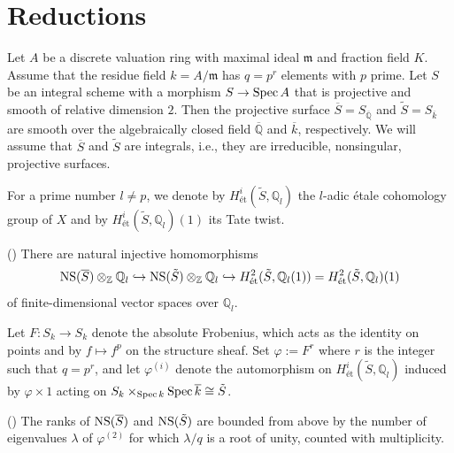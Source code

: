 \documentclass[main]{subfiles}
\begin{document}
\section{Reductions}
\label{sec:reduction}

Let $A$ be a discrete valuation ring with maximal ideal $\mathfrak{m}$ and fraction field $K$.
Assume that the residue field $k=A/\mathfrak{m}$ has $q=p^r$ elements with $p$ prime.
Let $S$ be an integral scheme with a morphism $S \to \operatorname{Spec} A$ that is projective and smooth of relative dimension $2$.
Then the projective surface $\overline{S}=S_{\overline{\mathbb{Q}}}$ and $\tilde{S}=S_{\overline{k}}$ are smooth over the algebraically closed field $\overline{\mathbb{Q}}$ and $\overline{k}$, respectively.
We will assume that $\overline{S}$ and $\tilde{S}$ are integrals, i.e., they are irreducible, nonsingular, projective surfaces.

For a prime number $l \neq p$, we denote by $H_{\text{\'et}}^{i}(\tilde{S}, \mathbb{Q}_l)$ the $l$-adic \'etale cohomology group of $X$ and by $H_{\text{\'et}}^{i}(\tilde{S}, \mathbb{Q}_l)(1)$ its Tate twist.

\begin{thm}{(\cite[Proposition 6.2.]{ref:vanluijk2007})}
    There are natural injective homomorphisms
    \begin{equation*}
        \operatorname{NS} (\overline{S}) \otimes_{\mathbb{Z}} \mathbb{Q}_{l} \hookrightarrow \operatorname{NS} (\tilde{S}) \otimes_{\mathbb{Z}} \mathbb{Q}_{l} \hookrightarrow H_{\text{\'et}}^{2}(\tilde{S}, \mathbb{Q}_{l}(1)) = H_{\text{\'et}}^{2}(\tilde{S}, \mathbb{Q}_{l})(1)
    \end{equation*}
    of finite-dimensional vector spaces over $\mathbb{Q}_l$.
\end{thm}

Let $F: S_k \to S_k$ denote the absolute Frobenius, which acts as the identity on points and by $f \mapsto f^p$ on the structure sheaf.
Set $\varphi:=F^{r}$ where $r$ is the integer such that $q=p^r$, and let $\varphi^{(i)}$ denote the automorphism on $H_{\text{\'et}}^{i}(\tilde{S}, \mathbb{Q}_l)$ induced by $\varphi \times 1$ acting on $S_k \times_{\operatorname{Spec} k} \operatorname{Spec} \overline{k} \cong \tilde{S}$.

\begin{cor}{(\cite[Corollary 6.4.]{ref:vanluijk2007})}
    \label{cor:ns_upper_bound}
    The ranks of $\operatorname{NS} (\overline{S})$ and $\operatorname{NS} (\tilde{S})$ are bounded from above by the number of eigenvalues $\lambda$ of $\varphi^{(2)}$ for which $\lambda/q$ is a root of unity, counted with multiplicity.
\end{cor}
\end{document}
